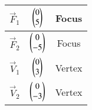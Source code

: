 
\begin{tabular}[]{|c|c|c|}
\hline
$\vec{F}_1$	& $\begin{pmatrix}0\\5\end{pmatrix}$ & Focus\\ \hline
$\vec{F}_2$	& $\begin{pmatrix}0\\-5\end{pmatrix}$ & Focus\\ \hline
$\vec{V}_1$	& $\begin{pmatrix}0\\3\end{pmatrix}$ & Vertex \\ \hline
$\vec{V}_2$ 	& $\begin{pmatrix}0\\-3\end{pmatrix}$ & Vertex\\ \hline
\end{tabular}
